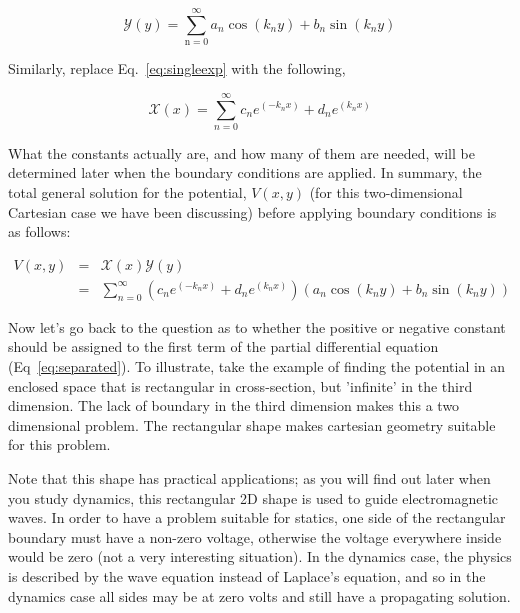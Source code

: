 \documentclass[12pt]{article}
\begin{document}
\begin{flushleft}
\begin{equation*}
\mathcal{Y}(y) = \sum_{\text{n}=0}^{\infty} a_{n} \cos{(k_{n}y)} + b_{n} \sin{(k_{n}y)}
\end{equation*}

Similarly, replace Eq.~\ref{eq:singleexp} with the following,

\begin{equation*}
\mathcal{X}(x) = \sum_{n=0}^{\infty} c_{n}e^{(-k_{n}x)} + d_{n}e^{(k_{n}x)}
\end{equation*}

What the constants actually are, and how many of them are needed, will be determined later when the boundary conditions are applied.  In summary, the total general solution for the potential, $V(x,y)$ (for this two-dimensional Cartesian case we have been discussing) before applying boundary conditions is as follows:

\begin{eqnarray}
V(x,y) & = & \mathcal{X}(x)\mathcal{Y}(y) \nonumber \\
& = & \sum_{n=0}^{\infty} \left( c_{n}e^{(-k_{n}x)} + d_{n}e^{(k_{n}x)} \right) \left( a_{n} \cos{(k_{n}y)} + b_{n} \sin{(k_{n}y)} \right)
\label{eq:gen2Dcartslan}
\end{eqnarray}

Now let's go back to the question as to whether the positive or negative constant should be assigned to the first term of the partial differential equation (Eq~\ref{eq:separated}).  To illustrate, take the example of finding the potential in an enclosed space that is rectangular in cross-section, but 'infinite' in the third dimension.  The lack of boundary in the third dimension makes this a two dimensional problem.  The rectangular shape makes cartesian geometry suitable for this problem.  

Note that this shape has practical applications; as you will find out later when you study dynamics, this rectangular 2D shape is used to guide electromagnetic waves.  In order to have a problem suitable for statics, one side of the rectangular boundary must have a non-zero voltage, otherwise the voltage everywhere inside would be zero (not a very interesting situation).  In the dynamics case, the physics is described by the wave equation instead of Laplace's equation, and so in the dynamics case all sides may be at zero volts and still have a propagating solution.


\end{flushleft}
\end{document}

